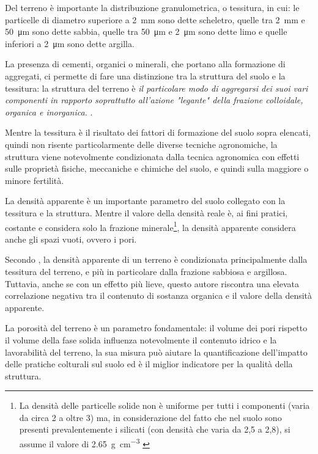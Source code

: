 \documentclass[11pt, a4paper, openright, titlepage, final, language = italian]{book}
\begin{document}
Del terreno è importante la distribuzione granulometrica,
o tessitura, in cui: le particelle di diametro superiore a \SI{2}{\milli\metre}
sono dette scheletro, quelle tra \SI{2}{\mm} e \SI{50}{\micro\metre} sono
dette sabbia, quelle tra \SI{50}{\micro\metre} e \SI{2}{\micro\metre}
sono dette limo e quelle inferiori a \SI{2}{\micro\metre} sono dette argilla.

La presenza di cementi, organici o minerali, che portano alla
formazione di aggregati, ci permette di fare
una distinzione tra la struttura del suolo e la tessitura: la
struttura del terreno è \textit{il particolare modo di aggregarsi dei
  suoi vari componenti in rapporto soprattutto all'azione "legante"
  della frazione colloidale, organica e inorganica.}
\citep{tassinari1976manuale}.

Mentre la tessitura \`e il risultato dei fattori di formazione del
suolo sopra elencati, quindi non risente particolarmente delle diverse
tecniche agronomiche, la struttura viene notevolmente condizionata
dalla tecnica agronomica con effetti sulle propriet\`a fisiche,
meccaniche e chimiche del suolo, e quindi sulla maggiore o minore fertilit\`a.

La densit\`a apparente \`e un importante parametro del suolo collegato con la tessitura e la
struttura. Mentre il valore della densit\`a reale è,
ai fini pratici, costante  e considera solo la frazione minerale\footnote{La densit\`a delle particelle solide non \`e uniforme per tutti i componenti (varia da circa 2 a oltre 3) ma, in considerazione del fatto che nel suolo sono presenti prevalentemente i silicati (con densit\`a che varia da 2,5 a 2,8), si assume il valore di
  \SI{2.65}{\gram\per\cubic\centi\metre} \citep{radaelli2001chimica}}, la
densit\`a apparente considera anche gli spazi vuoti, ovvero i pori.

Secondo \citet{AskinBulkDensity}, la densit\`a apparente di un terreno
è condizionata principalmente dalla tessitura del terreno, e pi\`u in
particolare dalla frazione sabbiosa e argillosa. Tuttavia, anche se
con un effetto pi\`u lieve, questo autore riscontra una elevata
correlazione negativa tra il contenuto di sostanza organica e il
valore della densit\`a apparente.


La porosit\`a del terreno è un parametro fondamentale: il volume dei
pori rispetto il volume della fase solida influenza notevolmente il
contenuto idrico e la lavorabilit\`a del terreno, la sua misura può
aiutare la quantificazione dell’impatto delle pratiche colturali sul
suolo ed è il miglior indicatore per la qualit\`a della struttura.
\end{document}

